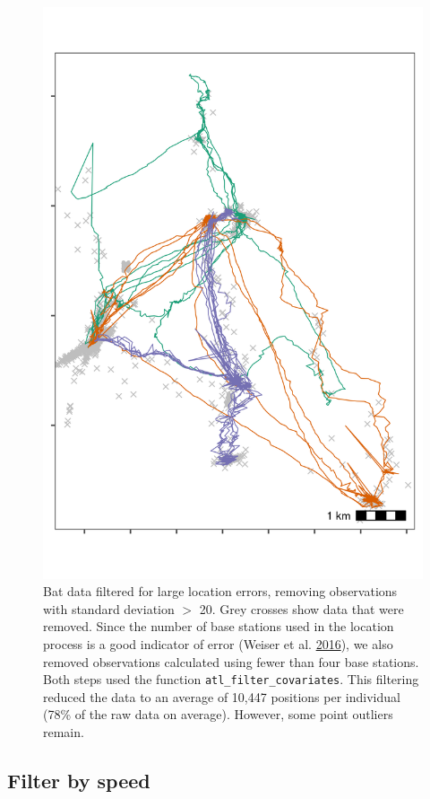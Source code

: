\documentclass[]{scrartcl}
\begin{document}
\begin{figure}
\centering
\includegraphics{figures/fig_bat_filter_cov.png}
\caption{Bat data filtered for large location errors, removing observations with standard deviation \(>\) 20. Grey crosses show data that were removed. Since the number of base stations used in the location process is a good indicator of error (Weiser et al. \protect\hyperlink{ref-weiser2016}{2016}), we also removed observations calculated using fewer than four base stations. Both steps used the function \texttt{atl\_filter\_covariates}.
This filtering reduced the data to an average of 10,447 positions per individual (78\% of the raw data on average). However, some point outliers remain.}
\end{figure}

\hypertarget{filter-by-speed}{%
\subsection{Filter by speed}\label{filter-by-speed}}
\end{document}
